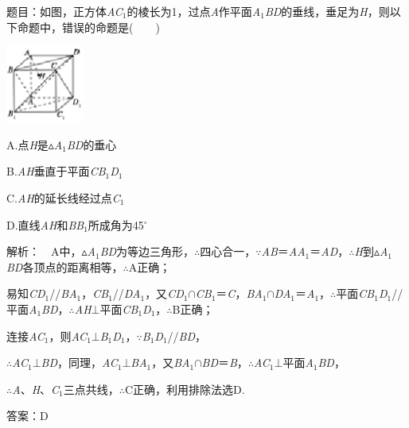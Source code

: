 \documentclass{article} %
\begin{document}
题目：如图，正方体\textit{AC}${}_{1}$的棱长为1，过点\textit{A}作平面\textit{A}${}_{1}$\textit{BD}的垂线，垂足为\textit{H}，则以下命题中，错误的命题是(　　)

\includegraphics*[width=1.02in, height=1.00in, keepaspectratio=false]{image240}

A.点\textit{H}是$\mathrm{\vartriangle}$\textit{A}${}_{1}$\textit{BD}的垂心

B.\textit{AH}垂直于平面\textit{CB}${}_{1}$\textit{D}${}_{1}$

C.\textit{AH}的延长线经过点\textit{C}${}_{1}$

D.直线\textit{AH}和\textit{BB}${}_{1}$所成角为45$\mathrm{{}^\circ}$

解析：　A中，$\mathrm{\vartriangle}$\textit{A}${}_{1}$\textit{BD}为等边三角形，$\mathrm{\therefore}$四心合一，$\mathrm{\because}$\textit{AB}＝\textit{AA}${}_{1}$＝\textit{AD}，$\mathrm{\therefore}$\textit{H}到$\mathrm{\vartriangle}$\textit{A}${}_{1}$\textit{BD}各顶点的距离相等，$\mathrm{\therefore}$A正确；

易知\textit{CD}${}_{1}$//\textit{BA}${}_{1}$，\textit{CB}${}_{1}$//\textit{DA}${}_{1}$，又\textit{CD}${}_{1}$$\mathrm{\cap}$\textit{CB}${}_{1}$＝\textit{C}，\textit{BA}${}_{1}$$\mathrm{\cap}$\textit{DA}${}_{1}$＝\textit{A}${}_{1}$，$\mathrm{\therefore}$平面\textit{CB}${}_{1}$\textit{D}${}_{1}$//平面\textit{A}${}_{1}$\textit{BD}，$\mathrm{\therefore}$\textit{AH}$\mathrm{\bot}$平面\textit{CB}${}_{1}$\textit{D}${}_{1}$，$\mathrm{\therefore}$B正确；

连接\textit{AC}${}_{1}$，则\textit{AC}${}_{1}$$\mathrm{\bot}$\textit{B}${}_{1}$\textit{D}${}_{1}$，$\mathrm{\because}$\textit{B}${}_{1}$\textit{D}${}_{1}$//\textit{BD}，

$\mathrm{\therefore}$\textit{AC}${}_{1}$$\mathrm{\bot}$\textit{BD}，同理，\textit{AC}${}_{1}$$\mathrm{\bot}$\textit{BA}${}_{1}$，又\textit{BA}${}_{1}$$\mathrm{\cap}$\textit{BD}＝\textit{B}，$\mathrm{\therefore}$\textit{AC}${}_{1}$$\mathrm{\bot}$平面\textit{A}${}_{1}$\textit{BD}，

$\mathrm{\therefore}$\textit{A}、\textit{H}、\textit{C}${}_{1}$三点共线，$\mathrm{\therefore}$C正确，利用排除法选D.

答案：D
\end{document}
